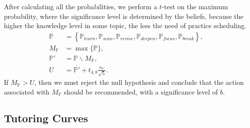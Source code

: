 \documentclass{article}
\newcommand{\0}{\mathbbold{0}}
\newcommand{\1}{\mathds{1}}
\newcommand{\2}{\mathbbold{2}}
\begin{document}
After calculating all the probabilities, we perform a $t$-test on the maximum probability, where the significance level is determined by the beliefs, because the higher the knowledge level in some topic, the less the need of practice scheduling.
\begin{align*}
    \mathbb{P} &= \left\{\mathbb{P}_\mathit{learn}, \mathbb{P}_\mathit{scan}, \mathbb{P}_\mathit{revise}, \mathbb{P}_\mathit{deepen}, \mathbb{P}_\mathit{focus}, \mathbb{P}_\mathit{break}\right\}, \\
    M_\mathbb{P} &= \max\{\mathbb{P}\}, \\
    \mathbb{P}' &= \mathbb{P}\backslash M_\mathbb{P}, \\
    U &= \overline{\mathbb{P}'} + t_{4,b}\frac{s_{\mathbb{P}'}}{\sqrt{5}}.
\end{align*}
If $M_\mathbb{P} > U$, then we must reject the null hypothesis and conclude that the action associated with $M_\mathbb{P}$ should be recommended, with a significance level of $b$.

\subsection{Tutoring Curves}
\end{document}

